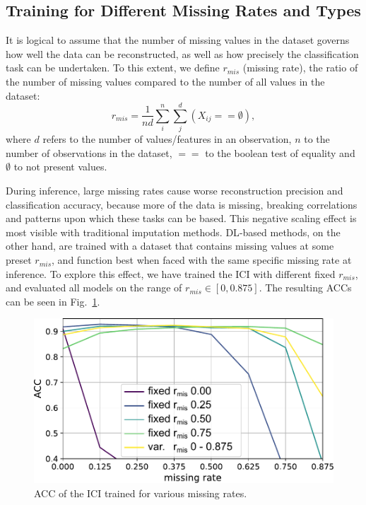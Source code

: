 			\subsection{Training for Different Missing Rates and Types}
			
				It is logical to assume that the number of missing values in the dataset governs how well the data can be reconstructed, as well as how precisely the classification task can be undertaken.
				To this extent, we define $r_{mis}$ (missing rate), the ratio of the number of missing values compared to the number of all values in the dataset:
				\begin{equation}
					r_{mis} = \frac{1}{nd} \sum_{i}^{n} \sum_{j}^{d} (X_{ij} == \emptyset),
				\end{equation}
				\noindent{}where $d$ refers to the number of values/features in an observation, $n$ to the number of observations in the dataset, $==$ to the boolean test of equality and $\emptyset$ to not present values.
				
				During inference, large missing rates cause worse reconstruction precision and classification accuracy, because more of the data is missing, breaking correlations and patterns upon which these tasks can be based.
				This negative scaling effect is most visible with traditional imputation methods.
				\ac{DL}-based methods, on the other hand, are trained with a dataset that contains missing values at some preset $r_{mis}$, and function best when faced with the same specific missing rate at inference.
				To explore this effect, we have trained the \ac{ICI} with different fixed $r_{mis}$, and evaluated all models on the range of $r_{mis} \in [0, 0.875]$.
				The resulting \acp{ACC} can be seen in Fig.~\ref{fig:acc_clf}.				
				
				\begin{figure}[ht]
					\centering
					\includegraphics[width=0.6\linewidth]{figures/12_imputation/acc_clf/acc_clf.pdf}
					\caption[ACC of the ICI trained for various missing rates]{ACC of the ICI trained for various missing rates.}
					\label{fig:acc_clf}
				\end{figure}
				
